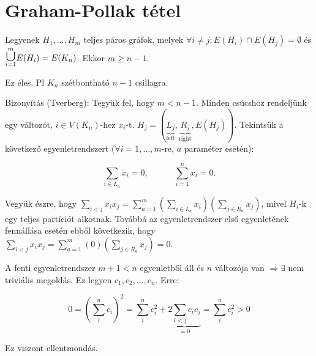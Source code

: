 \chapter{Graham-Pollak tétel}

\begin{thm}
  Legyenek $H_1, \dots, H_m$ teljes páros gráfok, melyek $\forall i \not = j: E(H_i) \cap E(H_j) = \emptyset$ és $\cuploop{m}{i=1} E(H_i) = E(K_n)$. Ekkor $m \geq n - 1$.
\end{thm}

\begin{obs}
  Ez éles. Pl $K_n$ szétbontható $n-1$ csillagra.
\end{obs}

Bizonyítás (Tverberg):
Tegyük fel, hogy $m < n-1$. Minden csúcshoz rendeljünk egy változót, $i \in V(K_n)$-hez $x_i$-t. $H_j = (\underbrace{L_j}_{\text{left}}, \underbrace{R_j}_{\text{right}}, E(H_j))$. Tekintsük a következő egyenletrendszert ($\forall i=1, \dots , m$-re, $a$ paraméter esetén):

\[\sum_{i \in L_a} x_i = 0, \hspace{3em} \sum_{i = 1}^{n} x_i = 0. \]

Vegyük észre, hogy $\sum\limits_{i < j} x_i x_j = \sum\limits_{a=1}^m \left(\sum\limits_{i \in L_a} x_i\right) \left(\sum\limits_{j \in R_a} x_j\right)$, mivel $H_i$-k egy teljes partíciót alkotnak. Továbbá az egyenletrendszer első egyenletének fennállása esetén ebből következik, hogy $\sum_{i < j} x_i x_j = \sum_{a=1}^m (0) \left(\sum\limits_{j \in R_a} x_j\right) = 0$.

\medskip

A fenti egyenletrendszer $m+1 < n$ egyenletből áll és $n$ változója van $\Rightarrow \exists$ nem triviális megoldás. Ez legyen $c_1, c_2, \dots, c_n$. Erre:

\[0 = \left(\sum_i^n c_i \right)^2 = \sum_i^n c_i^2 + \underbrace{2\sum_{i < j} c_i c_j}_{=0} = \sum_i^n c_i^2 > 0\]

Ez viszont ellentmondás. \QED

